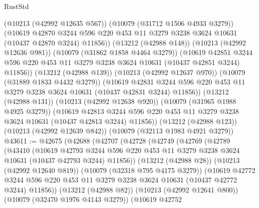 \begin{lexlean}{RustStd}
\begin{coremodule}
            (@10213 (@42992 @12635 @567))
            (@10079 (@31712 @1506 @4933 @3279))
            (@10619
              @42870
              @3244
              @596
              @220
              @453
              @11
              @3279
              @3238
              @3624
              @10631
              (@10437 @42870 @3244)
              @11856))
          (@13212 (@42988 @148))
          (@10213 (@42992 @12636 @981))
          (@10079 (@31862 @1858 @4464 @3279))
          (@10619
            @42851
            @3244
            @596
            @220
            @453
            @11
            @3279
            @3238
            @3624
            @10631
            (@10437 @42851 @3244)
            @11856))
        (@13212 (@42988 @139))
        (@10213 (@42992 @12637 @970))
        (@10079 (@31889 @1833 @4432 @3279))
        (@10619
          @42831
          @3244
          @596
          @220
          @453
          @11
          @3279
          @3238
          @3624
          @10631
          (@10437 @42831 @3244)
          @11856))
      (@13212 (@42988 @131))
      (@10213 (@42992 @12638 @920))
      (@10079 (@31965 @1988 @4925 @3279))
      (@10619
        @42813
        @3244
        @596
        @220
        @453
        @11
        @3279
        @3238
        @3624
        @10631
        (@10437 @42813 @3244)
        @11856))
    (@13212 (@42988 @123))
    (@10213 (@42992 @12639 @842))
    (@10079 (@32113 @1983 @4921 @3279))
@43611 := @42675
    (@42688
      (@42707
        (@42728
          (@42749
            (@42769
              (@42789
                (@43410
                  (@10619
                    @42793
                    @3244
                    @596
                    @220
                    @453
                    @11
                    @3279
                    @3238
                    @3624
                    @10631
                    (@10437 @42793 @3244)
                    @11856))
                (@13212 (@42988 @28))
                (@10213 (@42992 @12640 @819))
                (@10079 (@32318 @795 @4175 @3279))
                (@10619
                  @42772
                  @3244
                  @596
                  @220
                  @453
                  @11
                  @3279
                  @3238
                  @3624
                  @10631
                  (@10437 @42772 @3244)
                  @11856))
              (@13212 (@42988 @82))
              (@10213 (@42992 @12641 @800))
              (@10079 (@32470 @1976 @4143 @3279))
              (@10619
                @42752

\end{coremodule}
\end{lexlean}
